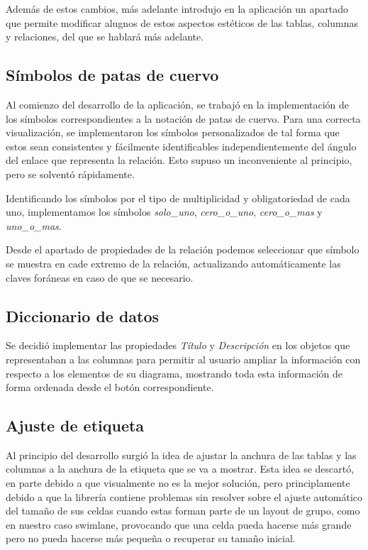 Además de estos cambios, más adelante introdujo en la aplicación un apartado que permite modificar alugnos de estos aspectos estéticos de las tablas, columnas y relaciones, del que se hablará más adelante.

\subsection{Símbolos de patas de cuervo}

Al comienzo del desarrollo de la aplicación, se trabajó en la implementación de los símbolos correspondientes a la notación de patas de cuervo. Para una correcta visualización, se implementaron los símbolos personalizados de tal forma que estos sean consistentes y fácilmente identificables independientemente del ángulo del enlace que representa la relación. Esto supuso un inconveniente al principio, pero se solventó rápidamente.


Identificando los símbolos por el tipo de multiplicidad y obligatoriedad de cada uno, implementamos los símbolos \textit{solo\_uno}, \textit{cero\_o\_uno}, \textit{cero\_o\_mas} y \textit{uno\_o\_mas}.

Desde el apartado de propiedades de la relación podemos seleccionar que símbolo se muestra en cade extremo de la relación, actualizando automáticamente las claves foráneas en caso de que se necesario.

\subsection{Diccionario de datos}

Se decidió implementar las propiedades \emph{Título} y \emph{Descripción} en los objetos que representaban a las columnas para permitir al usuario ampliar la información con respecto a los elementos de su diagrama, mostrando toda esta información de forma ordenada desde el botón correspondiente.

\subsection{Ajuste de etiqueta}

Al principio del desarrollo surgió la idea de ajustar la anchura de las tablas y las columnas a la anchura de la etiqueta que se va a mostrar. Esta idea se descartó, en parte debido a que visualmente no es la mejor solución, pero principlamente debido a que la librería contiene problemas sin resolver sobre el ajuste automático del tamaño de sus celdas cuando estas forman parte de un layout de grupo, como en nuestro caso swimlane, provocando que una celda pueda hacerse más grande pero no pueda hacerse más pequeña o recuperar su tamaño inicial.

